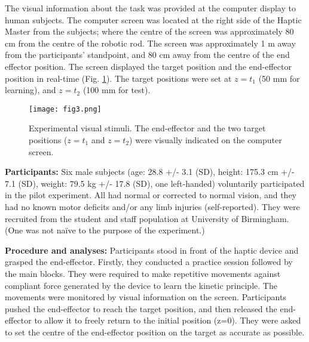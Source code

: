 The visual information about the task was provided at the computer display to human subjects. The computer screen was located at the right side of the Haptic Master from the subjects; where the centre of the screen was approximately 80 cm from the centre of the robotic rod. The screen was approximately 1 m away from the participants' standpoint, and 80 cm away from the centre of the end effector position. The screen displayed the target position and the end-effector position in real-time (Fig. \ref{stimuli}). The target positions were set at $z = t_1$ (50 mm for learning), and $z = t_2$ (100 mm for test).
%
\begin{figure}
	\centering
	\texttt{[image: fig3.png]}
	\caption{Experimental visual stimuli. The end-effector and the two target positions ($z = t_1$ and $z = t_2$) were visually indicated on the computer screen.}
	\label{stimuli}
\end{figure}


\textbf{Participants:} Six male subjects (age: 28.8 +/- 3.1 (SD), height: 175.3 cm +/- 7.1 (SD), weight: 79.5 kg +/- 17.8 (SD), one left-handed) voluntarily participated in the pilot experiment. All had normal or corrected to normal vision, and they had no known motor deficits and/or any limb injuries (self-reported). They were recruited from the student and staff population at University of Birmingham. (One was not naïve to the purpose of the experiment.)


\textbf{Procedure and analyses:} Participants stood in front of the haptic device and grasped the end-effector. Firstly, they conducted a practice session followed by the main blocks. They were required to make repetitive movements against compliant force generated by the device to learn the kinetic principle. The movements were monitored by visual information on the screen. Participants pushed the end-effector to reach the target position, and then released the end-effector to allow it to freely return to the initial position (z=0). They were asked to set the centre of the end-effector position on the target as accurate as possible. 

